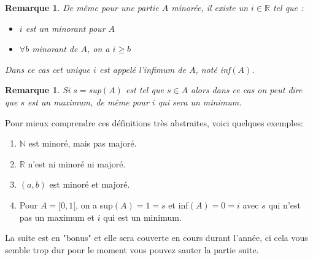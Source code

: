 \documentclass[a4paper, 12pt, french, twoside]{article}
\newtheorem{proposition}[theorem]{Proposition}
\newtheorem{rem}[theorem]{Remarque}
\newcommand{\Nn}{{\mathbb{N}}}
\newcommand{\Rr}{{\mathbb{R}}}
\newcommand{\Qq}{{\mathbb{Q}}}
\begin{document}
\begin{rem}
    De même pour une partie $A$ minorée, il existe un $i\in \Rr$ tel que :
    \begin{itemize}
    \item $i$ est un minorant pour $A$
    \item$\forall b$ minorant de $A$, on a $i\geq b$
\end{itemize}
    Dans ce cas cet unique $i$ est appelé l'infimum de $A$, noté inf$(A)$.
\end{rem}
\begin{rem}
    Si $s=$sup$(A)$ est tel que $s\in A$ alors dans ce cas on peut dire que $s$ est un maximum, de même pour $i$ qui sera un minimum.  
\end{rem}
Pour mieux comprendre ces définitions très abstraites, voici quelques exemples: 
\begin{enumerate}
\item $\Nn$ est minoré, mais pas majoré. 
\item $\Rr$ n'est ni minoré ni majoré. 
\item $(a,b)$ est minoré et majoré. 
    \item Pour $A=[0,1[$, on a sup$(A)=1=s$ et inf$(A)=0=i$ avec $s$ qui n'est pas un maximum et $i$ qui est un minimum. 
\end{enumerate}
La suite est en "bonus" et elle sera couverte en cours durant l'année, ci cela vous semble trop dur pour le moment vous pouvez sauter la partie suite.
    

\end{document}
